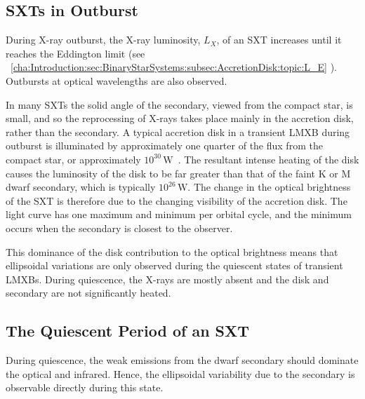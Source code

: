 
\subsection{SXTs in Outburst}\label{cha:Introduction:sec:X-rayBinaries:subsec:Outburst}

During X-ray outburst, the X-ray luminosity, $L_X$, of an SXT increases until it reaches
the Eddington limit (see%
\ \vref{cha:Introduction:sec:BinaryStarSystems:subsec:AccretionDisk:topic:L_E}%
). Outbursts at optical wavelengths are also observed.%

\vspace{\myparskip}

In many SXTs the solid angle of the secondary, viewed from the compact star, is small, and so the reprocessing
of X-rays takes place mainly in the accretion disk, rather than the secondary. A typical accretion disk in a transient LMXB during outburst is illuminated by approximately one quarter of the
flux from the compact star, or approximately
$10^{30}\,\mathrm{W}$~\cite{VanParadijsMcClintock:1995}. %
The resultant intense heating of the disk causes the luminosity of the
disk to be far greater than that of the faint K or M dwarf secondary,
which is typically $10^{26}\,\mathrm{W}$. %
The change in the optical brightness of the SXT is therefore due to the changing
visibility of the accretion disk. The light curve has one maximum and minimum per orbital
cycle, and the minimum occurs when the secondary is closest to the
observer. %

\vspace{\myparskip}

This dominance of the disk contribution to the optical brightness means
that ellipsoidal variations are only observed during the quiescent
states of transient LMXBs. During
quiescence, the X-rays are mostly absent and the disk and secondary are not
significantly heated. %


\subsection{The Quiescent Period of an SXT}\label{cha:Introduction:sec:X-rayBinaries:subsec:Quiescence}

During quiescence, the weak emissions from the dwarf secondary should dominate the optical and
infrared. Hence, the ellipsoidal variability due to the secondary is
observable directly during this state. %

